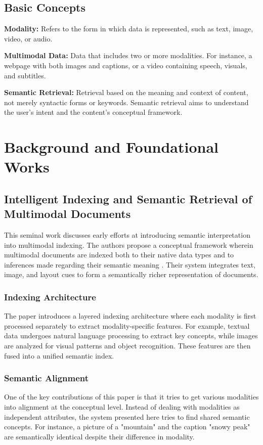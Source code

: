 \documentclass[conference]{IEEEtran}
\begin{document}
\subsection*{Basic Concepts}

\textbf{Modality:} Refers to the form in which data is represented, such as text, image, video, or audio.

\textbf{Multimodal Data:} Data that includes two or more modalities. For instance, a webpage with both images and captions, or a video containing speech, visuals, and subtitles.

\textbf{Semantic Retrieval:} Retrieval based on the meaning and context of content, not merely syntactic forms or keywords. Semantic retrieval aims to understand the user's intent and the content's conceptual framework.

\section{Background and Foundational Works}

\subsection{Intelligent Indexing and Semantic Retrieval of Multimodal Documents}
This seminal work discusses early efforts at introducing semantic interpretation into multimodal indexing. The authors propose a conceptual framework wherein multimodal documents are indexed both to their native data types and to inferences made regarding their semantic meaning \cite{pfeffer2001intelligent}. Their system integrates text, image, and layout cues to form a semantically richer representation of documents.

\subsubsection{Indexing Architecture}
The paper introduces a layered indexing architecture where each modality is first processed separately to extract modality-specific features. For example, textual data undergoes natural language processing to extract key concepts, while images are analyzed for visual patterns and object recognition. These features are then fused into a unified semantic index.

\subsubsection{Semantic Alignment}
One of the key contributions of this paper is that it tries to get various modalities into alignment at the conceptual level. Instead of dealing with modalities as independent attributes, the system presented here tries to find shared semantic concepts. For instance, a picture of a "mountain" and the caption "snowy peak" are semantically identical despite their difference in modality.
\end{document}
